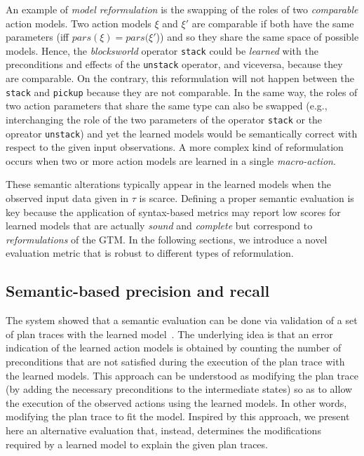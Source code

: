 An example of \emph{model reformulation} is the swapping of the roles of two {\em comparable} action models. Two action models $\xi$ and $\xi'$ are comparable if both have the same parameters (iff $pars(\xi)=pars(\xi'$)) and so they share the same space of possible models. Hence, the {\em blocksworld} operator {\small\tt stack} could be {\em learned} with the preconditions and effects of the {\small\tt unstack} operator, and viceversa, because they are comparable. On the contrary, this reformulation will not happen between the {\tt stack} and {\tt pickup} because they are not comparable. In the same way, the roles of two action parameters that share the same type can also be swapped (e.g., interchanging the role of the two parameters of the operator {\small\tt stack} or the opreator {\small\tt unstack}) and yet the learned models would be semantically correct with respect to the given input observations. A more complex kind of reformulation occurs when two or more action models are learned in a single \emph{macro-action}.


These semantic alterations typically appear in the learned models when the observed input data given in $\tau$ is scarce. Defining a proper semantic evaluation is key because the application of syntax-based metrics may report low scores for learned models that are actually {\em sound} and {\em complete} but correspond to {\em reformulations} of the GTM. In the following sections, we introduce a novel evaluation metric that is robust to different types of reformulation.


\subsection{Semantic-based precision and recall}
\label{semantic_precision_recall}

The \ARMS system showed that a semantic evaluation can be done via validation of a set of plan traces with the learned model~\cite{yang2007learning}. The underlying idea is that an error indication of the learned action models is obtained by counting the number of preconditions that are not satisfied during the execution of the plan trace with the learned models. This approach can be understood as modifying the plan trace (by adding the necessary preconditions to the intermediate states) so as to allow the execution of the observed actions using the learned models. In other words, modifying the plan trace to fit the model. Inspired by this approach, we present here an alternative evaluation that, instead, determines the modifications required by a learned model to explain the given plan traces.

